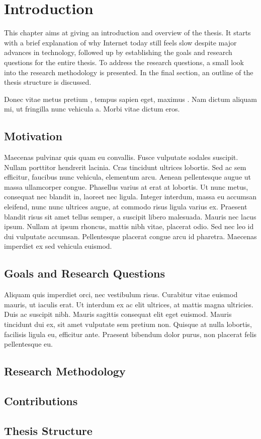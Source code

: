 \chapter{Introduction}

This chapter aims at giving an introduction and overview of the thesis. It starts with a brief explanation of why Internet today still feels slow despite major advances in technology, followed up by establishing the goals and research questions for the entire thesis. To address the research questions, a small look into the research methodology is presented. In the final section, an outline of the thesis structure is discussed.

Donec vitae metus pretium \cite{abe}, tempus sapien eget, maximus . Nam dictum aliquam mi, ut fringilla nunc vehicula a. Morbi vitae dictum eros.

\section{Motivation}

Maecenas pulvinar quis quam eu convallis. Fusce vulputate sodales suscipit. Nullam porttitor hendrerit lacinia. Cras tincidunt ultrices lobortis. Sed ac sem efficitur, faucibus nunc vehicula, elementum arcu. Aenean pellentesque augue ut massa ullamcorper congue. Phasellus varius at erat at lobortis. Ut nunc metus, consequat nec blandit in, laoreet nec ligula. Integer interdum, massa eu accumsan eleifend, nunc nunc ultrices augue, at commodo risus ligula varius ex. Praesent blandit risus sit amet tellus semper, a suscipit libero malesuada. Mauris nec lacus ipsum. Nullam at ipsum rhoncus, mattis nibh vitae, placerat odio. Sed nec leo id dui vulputate accumsan. Pellentesque placerat congue arcu id pharetra. Maecenas imperdiet ex sed vehicula euismod.

\section{Goals and Research Questions}

Aliquam quis imperdiet orci, nec vestibulum risus. Curabitur vitae euismod mauris, ut iaculis erat. Ut interdum ex ac elit ultrices, at mattis magna ultricies. Duis ac suscipit nibh. Mauris sagittis consequat elit eget euismod. Mauris tincidunt dui ex, sit amet vulputate sem pretium non. Quisque at nulla lobortis, facilisis ligula eu, efficitur ante. Praesent bibendum dolor purus, non placerat felis pellentesque eu.

\section{Research Methodology}

\section{Contributions}

\section{Thesis Structure}